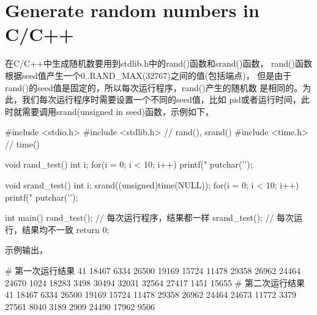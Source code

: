 \section[Generate random numbers in C/C++]{Generate random numbers in C/C++}
在C/C++中生成随机数要用到stdlib.h中的rand()函数和srand()函数，
rand()函数根据seed值产生一个0..RAND\_MAX(32767)之间的值(包括端点)，
但是由于rand()的seed值是固定的，所以每次运行程序，rand()产生的随机数
是相同的。为此，我们每次运行程序时需要设置一个不同的seed值，比如
pid或者运行时间，此时就需要调用srand(unsigned in seed)函数，示例如下，

\begin{cppcode}
#include <stdio.h>
#include <stdlib.h> // rand(), srand()
#include <time.h>   // time()

void rand_test() {
  int i;
  for(i = 0; i < 10; i++)
    printf(" %
  putchar('\n');
}

void srand_test() {
  int i;
  srand((unsigned)time(NULL));
  for(i = 0; i < 10; i++)
    printf(" %
  putchar('\n');
}

int main()
{
    rand_test(); // 每次运行程序，结果都一样
    srand_test(); // 每次运行，结果均不一致
    return 0;
}
\end{cppcode}

示例输出，

\begin{bashcode}
# 第一次运行结果
 41  18467  6334  26500  19169  15724  11478  29358  26962  24464
 24670  1024  18283  3498  30494  32031  32564  27417  1451  15655
# 第二次运行结果
 41  18467  6334  26500  19169  15724  11478  29358  26962  24464
 24673  11772  3379  27561  8040  3189  2909  24490  17962  9506
\end{bashcode}